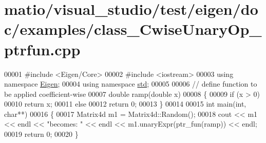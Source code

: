 \hypertarget{matio_2visual__studio_2test_2eigen_2doc_2examples_2class___cwise_unary_op__ptrfun_8cpp_source}{}\section{matio/visual\+\_\+studio/test/eigen/doc/examples/class\+\_\+\+Cwise\+Unary\+Op\+\_\+ptrfun.cpp}
\label{matio_2visual__studio_2test_2eigen_2doc_2examples_2class___cwise_unary_op__ptrfun_8cpp_source}

\begin{DoxyCode}
00001 \textcolor{preprocessor}{#include <Eigen/Core>}
00002 \textcolor{preprocessor}{#include <iostream>}
00003 \textcolor{keyword}{using namespace }\hyperlink{namespace_eigen}{Eigen};
00004 \textcolor{keyword}{using namespace }\hyperlink{namespacestd}{std};
00005 
00006 \textcolor{comment}{// define function to be applied coefficient-wise}
00007 \textcolor{keywordtype}{double} ramp(\textcolor{keywordtype}{double} x)
00008 \{
00009   \textcolor{keywordflow}{if} (x > 0)
00010     \textcolor{keywordflow}{return} x;
00011   \textcolor{keywordflow}{else} 
00012     \textcolor{keywordflow}{return} 0;
00013 \}
00014 
00015 \textcolor{keywordtype}{int} main(\textcolor{keywordtype}{int}, \textcolor{keywordtype}{char}**)
00016 \{
00017   Matrix4d m1 = Matrix4d::Random();
00018   cout << m1 << endl << \textcolor{stringliteral}{"becomes: "} << endl << m1.unaryExpr(ptr\_fun(ramp)) << endl;
00019   \textcolor{keywordflow}{return} 0;
00020 \}
\end{DoxyCode}
